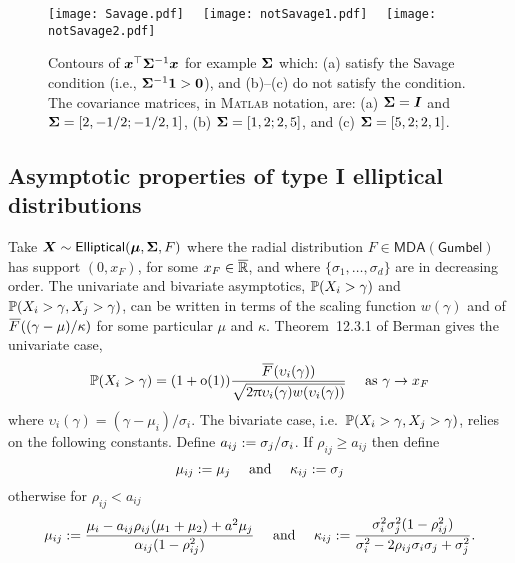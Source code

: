 \begin{subappendices}
\begin{figure}[H]
\centering
\texttt{[image: Savage.pdf]}~~
\texttt{[image: notSavage1.pdf]}~~
\texttt{[image: notSavage2.pdf]}
\caption{Contours of $\bm{x}^\top \bm{\Sigma}^{-1} \bm{x}$ for example $\bm{\Sigma}$ which: (a) satisfy the Savage condition (i.e., $\bm{\Sigma}^{-1} \bm{1} > \bm{0}$), and (b)--(c) do not satisfy the condition. The covariance matrices, in \textsc{Matlab} notation, are: (a) $\bm{\Sigma} = \bm{I}$ and  $\bm{\Sigma} =[2, -1/2; -1/2, 1]$, (b) $\bm{\Sigma} = [1, 2; 2, 5]$, and (c) $\bm{\Sigma} = [5, 2; 2, 1]$.}
\label{fig:savage_condition}
\end{figure}

\subsection{Asymptotic properties of type I elliptical distributions}

Take $\bm{X} \sim \mathsf{Elliptical}(\bm{\mu}, \bm{\Sigma}, F)$ where the radial distribution $F \in \mathsf{MDA(Gumbel)}$ has support $(0,x_F)$, for some $x_F \in \overline{\mathbb{R}}$, and where $\{\sigma_1, \dots, \sigma_d\}$ are in decreasing order.
The univariate and bivariate asymptotics, $\operatorname{{\mathbb P}}(X_i > \gamma)$ and $\operatorname{{\mathbb P}}(X_i > \gamma, X_j > \gamma)$, can be written in terms of the scaling function $w(\gamma)$ and of $\Ftail((\gamma-\mu)/\kappa)$ for some particular $\mu$ and $\kappa$.
Theorem~12.3.1 of Berman \cite{berman1992sojourns} gives the univariate case,
\begin{equation} \label{berman}
 \Prob(X_i > \gamma) =  (1+\oh(1)) \frac{ \Ftail(\upsilon_i(\gamma)) }
 {\sqrt{2\pi \upsilon_i(\gamma) w(\upsilon_i(\gamma)) }} \quad \text{ as } \gamma \to x_F
\end{equation}
where $\upsilon_i(\gamma) = (\gamma - \mu_i)/\sigma_i$. The bivariate case, i.e.\ $\operatorname{{\mathbb P}}(X_i > \gamma, X_j > \gamma)$, relies on the following constants. Define $a_{ij} := \sigma_j/\sigma_i$. If $\rho_{ij} \ge a_{ij}$ then define
 \[ \mu_{ij} := \mu_j \quad \text{ and } \quad \kappa_{ij} := \sigma_j \]
 otherwise for $\rho_{ij} < a_{ij}$
 \[ \mu_{ij} := \frac{\mu_i-a_{ij}\rho_{ij}(\mu_1+\mu_2)+a^2\mu_j}{\alpha_{ij}(1-\rho^2_{ij})} \quad \text{ and } \quad \kappa_{ij} := \frac{\sigma_i^2\sigma_j^2(1-\rho^2_{ij})}{ {\sigma_i^2-2\rho_{ij}\sigma_i\sigma_j + \sigma_{j}^2}}. \]


\end{subappendices}
